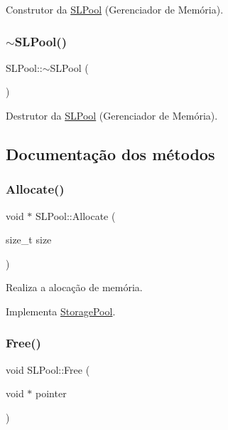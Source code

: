 Construtor da \hyperlink{classSLPool}{S\+L\+Pool} (Gerenciador de Memória). 

\mbox{\label{classSLPool_aec8dd0c2fe10addb1786447f8ed62c20}} 
\subsubsection{\texorpdfstring{$\sim$\+S\+L\+Pool()}{~SLPool()}}
{\footnotesize\ttfamily S\+L\+Pool\+::$\sim$\+S\+L\+Pool (\begin{DoxyParamCaption}{ }\end{DoxyParamCaption})}



Destrutor da \hyperlink{classSLPool}{S\+L\+Pool} (Gerenciador de Memória). 



\subsection{Documentação dos métodos}
\mbox{\label{classSLPool_aaf054ceb8fa1b8e659f656f04a07dc84}} 
\subsubsection{\texorpdfstring{Allocate()}{Allocate()}}
{\footnotesize\ttfamily void $\ast$ S\+L\+Pool\+::\+Allocate (\begin{DoxyParamCaption}\item[{size\+\_\+t}]{size }\end{DoxyParamCaption})\hspace{0.3cm}{\ttfamily [virtual]}}



Realiza a alocação de memória. 



Implementa \hyperlink{classStoragePool_a123a07b2fff40000102b401d7d1b5d5a}{Storage\+Pool}.

\mbox{\label{classSLPool_aed31c75c4a2d56acd2f845dda2c5b1ad}} 
\subsubsection{\texorpdfstring{Free()}{Free()}}
{\footnotesize\ttfamily void S\+L\+Pool\+::\+Free (\begin{DoxyParamCaption}\item[{void $\ast$}]{pointer }\end{DoxyParamCaption})\hspace{0.3cm}{\ttfamily [virtual]}}



